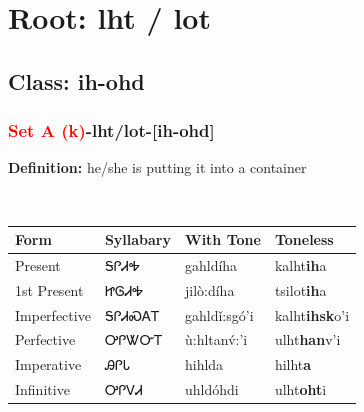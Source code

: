 \needspace{4in}
\section*{Root: lht / lot}
\nopagebreak
{}
\needspace{3in}
\subsection*{Class: ih-ohd}
\nopagebreak
\needspace{2in}
\subsubsection*{\textcolor{Red}{Set A (k)}{-}\textbf{lht/lot}{-}[ih-ohd]}
\nopagebreak
\textbf{Definition: } he/she is putting it into a container
\\[0.5em]
\begin{tabularx}{\textwidth}{l X X X}%
\toprule%
\textbf{Form}&\textbf{Syllabary}&\textbf{With Tone}&\textbf{Toneless}\\%
\midrule%
Present&ᎦᎵᏗᎭ&gahldíha&kalht\textbf{ih}a\\%
1st Present&ᏥᎶᏗᎭ&jilò:díha&tsilot\textbf{ih}a\\%
Imperfective&ᎦᎵᏗᏍᎪᎢ&gahldǐ:sgó’i&kalht\textbf{ihsk}o'i\\%
Perfective&ᎤᎵᏔᏅᎢ&ù:hltanv́:’i&ulht\textbf{han}v'i\\%
Imperative&ᎯᎵᏓ&hihlda&hilht\textbf{a}\\%
Infinitive&ᎤᎵᏙᏗ&uhldóhdi&ulht\textbf{oht}i\\%
\bottomrule%
\end{tabularx}
\\[1em]